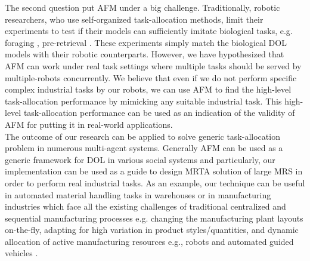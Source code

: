 The second question put AFM under a big challenge. Traditionally, robotic researchers, who use self-organized task-allocation methods, limit their experiments to test  if their models can sufficiently imitate biological tasks, e.g. foraging , pre-retrieval . These experiments simply match the biological DOL models with their robotic counterparts. However, we have hypothesized that AFM can work under real task settings where multiple tasks  should be served by multiple-robots concurrently. We believe that even if we do not perform specific complex industrial tasks by our robots, we can use AFM to find the high-level task-allocation performance by mimicking any suitable industrial task. This  high-level task-allocation performance can be used as an indication of the validity of AFM for putting it in real-world applications.\\
The outcome of our research can be applied to solve generic task-allocation problem in numerous multi-agent systems. Generally AFM can be used as a generic framework for DOL in various social systems and particularly, our implementation can be used as a guide to design MRTA solution of large MRS in order to perform real industrial tasks. As an example, our technique can be useful in automated material handling tasks in warehouses or in manufacturing  industries which face all the existing challenges of traditional centralized and sequential manufacturing processes e.g. changing the manufacturing plant layouts on-the-fly, adapting for high variation in product styles/quantities, and dynamic allocation of active manufacturing resources e.g., robots and automated guided vehicles \cite{Shen+2006}.
% 
